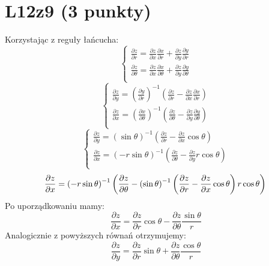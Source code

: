 \documentclass{article}
\begin{document}
\section{L12z9 (3 punkty)}
Korzystając z reguły łańcucha:
$$
\begin{cases}
\frac{\partial z}{\partial r} = \frac{\partial z}{\partial x}\frac{\partial x}{\partial r} + \frac{\partial z}{\partial y}\frac{\partial y}{\partial r}\\
\frac{\partial z}{\partial \theta} = \frac{\partial z}{\partial x}\frac{\partial x}{\partial \theta} + \frac{\partial z}{\partial y}\frac{\partial y}{\partial \theta}\\
\end{cases}
$$
$$
\begin{cases}
\frac{\partial z}{\partial y} = \left(\frac{\partial y}{\partial r}\right)^{-1} \left( \frac{\partial z}{\partial r} - \frac{\partial z}{\partial x}\frac{\partial x}{\partial r} \right)\\
\frac{\partial z}{\partial x} = \left(\frac{\partial x}{\partial \theta}\right)^{-1} \left( \frac{\partial z}{\partial \theta} - \frac{\partial z}{\partial y}\frac{\partial y}{\partial \theta} \right)\\
\end{cases}
$$
$$
\begin{cases}
\frac{\partial z}{\partial y} = \left(\sin \theta\right)^{-1} \left( \frac{\partial z}{\partial r} - \frac{\partial z}{\partial x}\cos \theta\right)\\
\frac{\partial z}{\partial x} = \left(-r\sin\theta\right)^{-1} \left( \frac{\partial z}{\partial \theta} - \frac{\partial z}{\partial y}r\cos\theta \right)\\
\end{cases}
$$
$$
\frac{\partial z}{\partial x} = \left(-r\sin\theta\right)^{-1} \left( \frac{\partial z}{\partial \theta} - \left(\sin \theta\right)^{-1} \left( \frac{\partial z}{\partial r} - \frac{\partial z}{\partial x}\cos \theta\right)r\cos\theta \right)\\
$$
Po uporządkowaniu mamy:
$$
\frac{\partial z}{\partial x} = \frac{\partial z}{\partial r}\cos \theta - \frac{\partial z}{\partial \theta}\frac{\sin \theta}{r}
$$
Analogicznie z powyższych równań otrzymujemy:
$$
\frac{\partial z}{\partial y} = \frac{\partial z}{\partial r}\sin\theta + \frac{\partial z}{\partial \theta}\frac{\cos \theta}{r}
$$\\\\\\\\\\\
\end{document}
